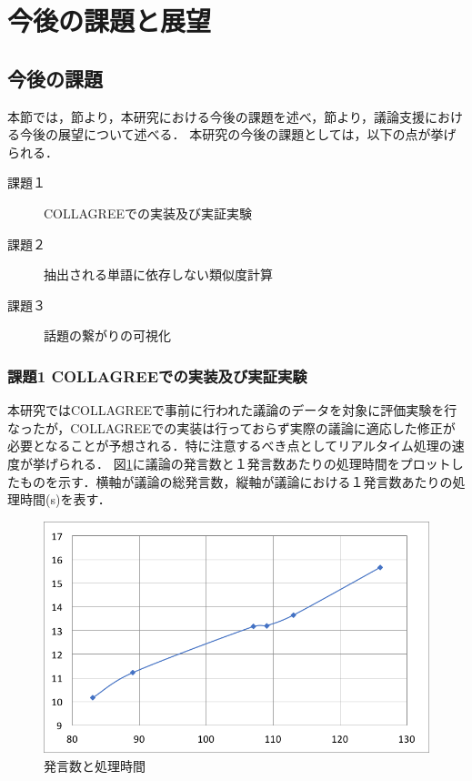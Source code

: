 \section{今後の課題と展望}
\label{con:task_and_future}
\subsection{今後の課題}
\label{con:task}
本節では，\label{con:task}節より，本研究における今後の課題を述べ，節より，議論支援における今後の展望について述べる．
本研究の今後の課題としては，以下の点が挙げられる．
\begin{description}
  \item[課題１] COLLAGREEでの実装及び実証実験
  \item[課題２] 抽出される単語に依存しない類似度計算
  \item[課題３] 話題の繋がりの可視化
\end{description}
\subsubsection*{課題1 COLLAGREEでの実装及び実証実験}
本研究ではCOLLAGREEで事前に行われた議論のデータを対象に評価実験を行なったが，COLLAGREEでの実装は行っておらず実際の議論に適応した修正が必要となることが予想される．特に注意するべき点としてリアルタイム処理の速度が挙げられる．
図\ref{Fig:Graph-Remark&Time}に議論の発言数と１発言数あたりの処理時間をプロットしたものを示す．横軸が議論の総発言数，縦軸が議論における１発言数あたりの処理時間(s)を表す．

\begin{figure}[htbp]
 \begin{center}
  \includegraphics[width=\textwidth]{../images/6.Conclusion/Graph-Remark&Time.png}
  \caption{発言数と処理時間}
  \label{Fig:Graph-Remark&Time}
  \vspace{-10pt}
 \end{center}
\end{figure}

